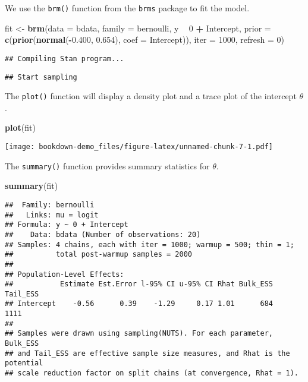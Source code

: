 \documentclass[
]{book}
\newenvironment{Shaded}{\begin{snugshade}}{\end{snugshade}}
\newcommand{\DataTypeTok}[1]{\textcolor[rgb]{0.13,0.29,0.53}{#1}}
\newcommand{\DecValTok}[1]{\textcolor[rgb]{0.00,0.00,0.81}{#1}}
\newcommand{\FloatTok}[1]{\textcolor[rgb]{0.00,0.00,0.81}{#1}}
\newcommand{\KeywordTok}[1]{\textcolor[rgb]{0.13,0.29,0.53}{\textbf{#1}}}
\newcommand{\NormalTok}[1]{#1}
\newcommand{\OperatorTok}[1]{\textcolor[rgb]{0.81,0.36,0.00}{\textbf{#1}}}
\newcommand{\StringTok}[1]{\textcolor[rgb]{0.31,0.60,0.02}{#1}}
\begin{document}
We use the \texttt{brm()} function from the \texttt{brms} package to fit the model.

\begin{Shaded}
\begin{Highlighting}[]
\NormalTok{fit <-}\StringTok{ }\KeywordTok{brm}\NormalTok{(}\DataTypeTok{data =}\NormalTok{ bdata, }
            \DataTypeTok{family =}\NormalTok{ bernoulli,}
\NormalTok{            y  }\OperatorTok{~}\StringTok{ }\DecValTok{0} \OperatorTok{+}\StringTok{ }\NormalTok{Intercept,}
            \DataTypeTok{prior =} \KeywordTok{c}\NormalTok{(}\KeywordTok{prior}\NormalTok{(}\KeywordTok{normal}\NormalTok{(}\OperatorTok{-}\FloatTok{0.400}\NormalTok{, }\FloatTok{0.654}\NormalTok{), }
                           \DataTypeTok{coef =}\NormalTok{ Intercept)),}
            \DataTypeTok{iter =} \DecValTok{1000}\NormalTok{,}
            \DataTypeTok{refresh =} \DecValTok{0}\NormalTok{)}
\end{Highlighting}
\end{Shaded}

\begin{verbatim}
## Compiling Stan program...
\end{verbatim}

\begin{verbatim}
## Start sampling
\end{verbatim}

The \texttt{plot()} function will display a density plot and a trace plot of the intercept \(\theta\).

\begin{Shaded}
\begin{Highlighting}[]
\KeywordTok{plot}\NormalTok{(fit)}
\end{Highlighting}
\end{Shaded}

\texttt{[image: bookdown-demo\_files/figure-latex/unnamed-chunk-7-1.pdf]}

The \texttt{summary()} function provides summary statistics for \(\theta\).

\begin{Shaded}
\begin{Highlighting}[]
\KeywordTok{summary}\NormalTok{(fit)}
\end{Highlighting}
\end{Shaded}

\begin{verbatim}
##  Family: bernoulli 
##   Links: mu = logit 
## Formula: y ~ 0 + Intercept 
##    Data: bdata (Number of observations: 20) 
## Samples: 4 chains, each with iter = 1000; warmup = 500; thin = 1;
##          total post-warmup samples = 2000
## 
## Population-Level Effects: 
##           Estimate Est.Error l-95% CI u-95% CI Rhat Bulk_ESS Tail_ESS
## Intercept    -0.56      0.39    -1.29     0.17 1.01      684     1111
## 
## Samples were drawn using sampling(NUTS). For each parameter, Bulk_ESS
## and Tail_ESS are effective sample size measures, and Rhat is the potential
## scale reduction factor on split chains (at convergence, Rhat = 1).
\end{verbatim}
\end{document}
